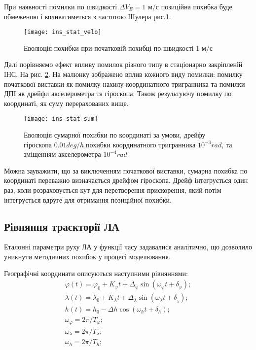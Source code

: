 При наявності помилки по швидкості $\Delta V_{E} =1$ м/с позиційна похибка буде обмеженою і коливатиметься з частотою Шулера рис.\ref{fig:ins_stat_velo}.
\begin{figure}[here]
\centering
\texttt{[image: ins\_stat\_velo]}
\caption{Еволюція похибки при початковій похибці по швидкості 1 м/с}
\label{fig:ins_stat_velo}
\end{figure}

Далі порівняємо ефект впливу помилок різного типу в стаціонарно закріпленій ІНС. На рис. \ref{fig:ins_stat_sum}.
На малюнку зображено вплив кожного виду помилки: помилку початкової виставки як помилку нахилу координатного тригранника та помилки ДПІ як дрейфи акселерометра та гіроскопа. Також результуючу помилку по координаті, як суму перерахованих вище.
\begin{figure}[H]
\centering
\texttt{[image: ins\_stat\_sum]}
\caption{Еволюція сумарної похибки по координаті за умови,
дрейфу гіроскопа   $0.01 deg/h$,похибки координатного тригранника $10^{-3} rad$, та зміщенням акселерометра $10^{-4} rad$ }\label{fig:ins_stat_sum}
\end{figure}

Можна зауважити, що за виключенням початкової виставки, сумарна похибка по координаті переважно визначається дрейфом гіроскопа. Дрейф інтегрується один раз, коли розраховується кут для перетворення прискорення, який потім інтегрується вдруге для отримання позиційної похибки.

\subsection{Рівняння траєкторії ЛА}

Еталонні параметри руху ЛА у функції часу задавалися аналітично, що дозволило уникнути методичних похибок у процесі моделювання.

Географічні координати описуються наступними рівняннями:
\begin{equation}
\label{emu_path_pos} 
\begin{array}{l} 
{\varphi (t)=\varphi_{0}+K_{\varphi } t+\Delta_{\varphi } \sin (\omega_{\varphi } t+\delta_{\varphi } );} \\ 
{\lambda (t)=\lambda_{0}+K_{\lambda } t+\Delta_{\lambda } \sin (\omega_{\lambda } t+\delta_{_{\lambda } } );} \\ 
{h(t)=h_{0} -\Delta h \cos (\omega_{h} t+\delta_{h} );} \\ 
{\omega _{\varphi } =2\pi /T_{\varphi } ;} \\ {\omega _{\lambda } =2\pi /T_{\lambda } ;} \\ 
{\omega _{h} =2\pi /T_{h} ;} 
\end{array}
\end{equation}

